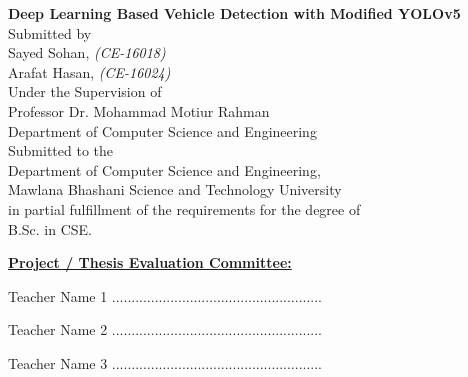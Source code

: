 \begin{titlepage}
\begin{center}
    \Large
    \textbf{Deep Learning Based Vehicle Detection with Modified YOLOv5}\\
    
    \vspace{2.5cm}
  \small{Submitted by}\\
    \large{Sayed Sohan, \small{\textit{(CE-16018)}}}\\
    \large{Arafat Hasan, \small{\textit{(CE-16024)}}}\\
     
    \vspace{0.5cm}
   \small
     {Under the Supervision of}\\
     \large{Professor Dr. Mohammad Motiur Rahman}\\
     \normalsize{Department of Computer Science and Engineering}\\
    


    \vspace{0.5cm}
       \small{Submitted to the}\\
    \large{Department of Computer Science and Engineering,}\\
    \normalsize{Mawlana Bhashani Science and Technology University\\
    in partial fulfillment of the requirements for the degree of\\
    B.Sc. in CSE.}
    
\end{center}


\vspace{1.5cm}
\large
\underline{\textbf{Project / Thesis Evaluation Committee:}}

\vspace{1cm}

Teacher Name 1 ......................................................

\vspace{1cm}

Teacher Name 2 ......................................................

\vspace{1cm}
Teacher Name 3 ......................................................
\end{titlepage}